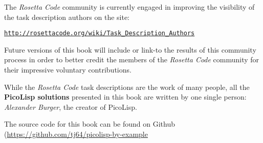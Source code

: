 The \emph{Rosetta Code} community is currently engaged in improving
the visibility of the task description authors on the site:

\href{http://rosettacode.org/wiki/Task\_Description\_Authors}{\texttt{http://rosettacode.org/wiki/Task\_Description\_Authors}}

Future versions of this book will include or link-to the results of
this community process in order to better credit the members of the
\emph{Rosetta Code} community for their impressive voluntary
contributions. 
     
While the \emph{Rosetta Code} task descriptions are the work of many
people, all the \textbf{PicoLisp solutions} presented in this book are
written by one single person: \emph{Alexander Burger}, the creator of
PicoLisp.

The source code for this book can be found on Github (\href{https://github.com/tj64/picolisp-by-example}{\url{https://github.com/tj64/picolisp-by-example}}





